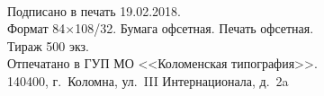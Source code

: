 \newpage
\thispagestyle{empty}
~
\vfill
\centering
\begin{minipage}{0.7\tw}
	\small
	\centering
	Подписано в печать 19.02.2018.\\
	Формат 84$\times$108/32. Бумага офсетная. Печать офсетная.\\
	Тираж 500 экз.\\ 
	Отпечатано в ГУП МО <<Коломенская типография>>.\\ 140400, г.~Коломна, ул.~III Интернационала, д.~2a
\end{minipage}